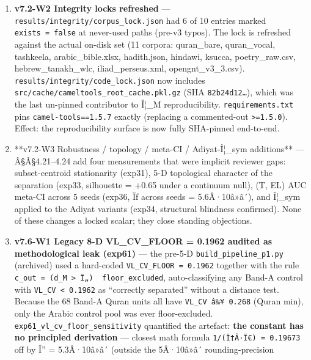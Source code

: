 \documentclass[
]{article}
\begin{document}
\begin{enumerate}
  (\texttt{exp35\_R3\_cross\_scripture\_redo}, N\_PERM = 5 000 per
  scripture) gives
  \texttt{z\_Quran\ =\ âˆ’8.92,\ z\_Tanakh\ =\ âˆ’15.29,\ z\_GreekNT\ =\ âˆ’12.06,\ z\_Iliad\ =\ +0.34},
  supersedes the v7.1 table, and FALSIFIES the ``Quran â‰ˆ76 \% stronger
  than next scripture'' framing (see Â§5 row for detail).
\item
  \textbf{v7.2-W2 Integrity locks refreshed} ---
  \texttt{results/integrity/corpus\_lock.json} had 6 of 10 entries
  marked \texttt{exists\ =\ false} at never-used paths (pre-v3 typos).
  The lock is refreshed against the actual on-disk set (11 corpora:
  quran\_bare, quran\_vocal, tashkeela, arabic\_bible.xlsx, hadith.json,
  hindawi, ksucca, poetry\_raw.csv, hebrew\_tanakh\_wlc,
  iliad\_perseus.xml, opengnt\_v3\_3.csv).
  \texttt{results/integrity/code\_lock.json} now includes
  \texttt{src/cache/cameltools\_root\_cache.pkl.gz} (SHA
  \texttt{82b24d12…}), which was the last un-pinned contributor to Î¦\_M
  reproducibility. \texttt{requirements.txt} pins
  \texttt{camel-tools==1.5.7} exactly (replacing a commented-out
  \texttt{\textgreater{}=1.5.0}). Effect: the reproducibility surface is
  now fully SHA-pinned end-to-end.
\item
  **v7.2-W3 Robustness / topology / meta-CI / Adiyat-Î¦\_sym additions**
  --- Â§Â§4.21--4.24 add four measurements that were implicit reviewer
  gaps: subset-centroid stationarity (exp31), 5-D topological character
  of the separation (exp33, silhouette = +0.65 under a continuum null),
  (T, EL) AUC meta-CI across 5 seeds (exp36, Ïƒ across seeds =
  5.6Â·10â»â´), and Î¦\_sym applied to the Adiyat variants (exp34,
  structural blindness confirmed). None of these changes a locked
  scalar; they close standing objections.
\item
  \textbf{v7.6-W1 Legacy 8-D VL\_CV\_FLOOR = 0.1962 audited as
  methodological leak (exp61)} --- the pre-5-D
  \texttt{build\_pipeline\_p1.py} (archived) used a hard-coded
  \texttt{VL\_CV\_FLOOR\ =\ 0.1962} together with the rule
  \texttt{c\_out\ =\ (d\_M\ \textgreater{}\ Ï„)\ \textbar{}\ floor\_excluded},
  auto-classifying any Band-A control with
  \texttt{VL\_CV\ \textless{}\ 0.1962} as ``correctly separated''
  without a distance test. Because the 68 Band-A Quran units all have
  \texttt{VL\_CV\ â‰¥\ 0.268} (Quran min), only the Arabic control pool
  was ever floor-excluded. \texttt{exp61\_vl\_cv\_floor\_sensitivity}
  quantified the artefact: \textbf{the constant has no principled
  derivation} --- closest math formula \texttt{1/(Ï†Â·Ï€)\ =\ 0.19673}
  off by Î'' = 5.3Â·10â»â´ (outside the 5Â·10â»â´ rounding-precision

\end{enumerate}
\end{document}
